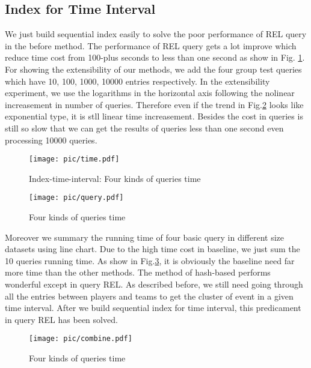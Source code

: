 \subsection{Index for Time Interval}
We just build sequential index easily to solve the poor performance of REL query in the before method. The performance 
of REL query gets a lot improve which reduce time cost from 100-plus seconds to less than one second as show in Fig.
\ref{time-idx}. For showing the  extensibility of our methods, we add the four group test queries which have 10, 100, 
1000, 10000 entries respectively. In the extensibility experiment, we use the logarithms in the horizontal axis following
the nolinear increasement in number of queries. Therefore even if the trend in Fig.\ref{query} looks like exponential type, 
it is stll linear time increasement. Besides the cost in queries is still so slow that we can get the results of queries less
than one second even processing 10000 queries.
\begin{figure}[H]
	\centering
	\texttt{[image: pic/time.pdf]}\\
	\caption{Index-time-interval: Four kinds of queries time}
	\label{time-idx}
\end{figure}

\begin{figure}[H]
	\centering
	\texttt{[image: pic/query.pdf]}\\
	\caption{Four kinds of queries time}
	\label{query}
\end{figure}
Moreover we summary the running time of four basic query in different size datasets using line chart. Due to the high time cost 
in baseline, we just sum the 10 queries running time. As show in Fig.\ref{combine}, it is obviously the baseline need far more time
than the other methods. The method of hash-based performs wonderful except in query REL. As described before,  we still need going 
through all the entries between players and teams to get the cluster of event in a given time interval. After we build sequential
index for time interval, this predicament in query REL has been solved.





\begin{figure}[H]
	\centering
	\texttt{[image: pic/combine.pdf]}\\
	\caption{Four kinds of queries time}
	\label{combine}
\end{figure}

